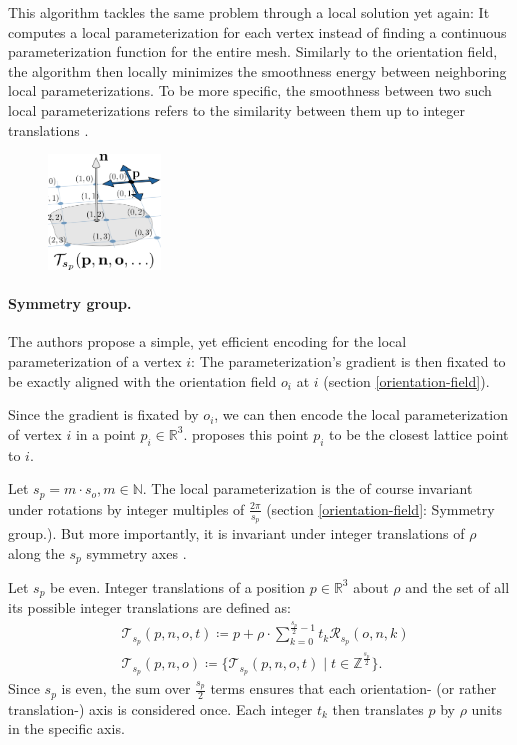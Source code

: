 \documentclass{ACGSeminar}
\begin{document}
This algorithm tackles the same problem through a local solution yet again: It computes a local parameterization for each vertex instead of finding a continuous parameterization function for the entire mesh. Similarly to the orientation field, the algorithm then locally minimizes the smoothness energy between neighboring local parameterizations. To be more specific, the smoothness between two such local parameterizations refers to the similarity between them up to integer translations \cite{jakob2015instant}.

\begin{figure}
	\includegraphics[width=3cm]{img/integer-translation.png}\par
	\label{fig:integer-translation}
\end{figure}

\paragraph{Symmetry group.}
The authors propose a simple, yet efficient encoding for the local parameterization of a vertex $i$: The parameterization's gradient is then fixated to be exactly aligned with the orientation field $o_i$ at $i$ (section \ref{orientation-field}).

Since the gradient is fixated by $o_i$, we can then encode the local parameterization of vertex $i$ in a point $p_i \in \mathbb{R}^3$. \cite{jakob2015instant} proposes this point $p_i$ to be the closest lattice point to $i$.

Let $s_p = m \cdot s_o, m \in \mathbb{N}$. The local parameterization is the of course invariant under rotations by integer multiples of $\frac{2\pi}{s_p}$ (section \ref{orientation-field}: Symmetry group.). But more importantly, it is invariant under integer translations of $\rho$ along the $s_p$ symmetry axes \cite{jakob2015instant}.\bigskip

Let $s_p$ be even. Integer translations of a position $p \in \mathbb{R}^3$ about $\rho$ and the set of all its possible integer translations are defined as:
\begin{equation*}
\begin{split}
	& \mathcal{T}_{s_p}(p,n,o,t) \coloneqq p + \rho \cdot \sum_{k=0}^{\frac{s_p}{2}-1} t_k \mathcal{R}_{s_p}(o,n,k)\\
	& \mathcal{T}_{s_p}(p,n,o) \coloneqq \{\mathcal{T}_{s_p}(p,n,o,t) \mid t \in \mathbb{Z}^{\frac{s_p}{2}}\}.
\end{split}
\end{equation*}
Since $s_p$ is even, the sum over $\frac{s_p}{2}$ terms ensures that each orientation- (or rather translation-) axis is considered once. Each integer $t_k$ then translates $p$ by $\rho$ units in the specific axis.
\end{document}
